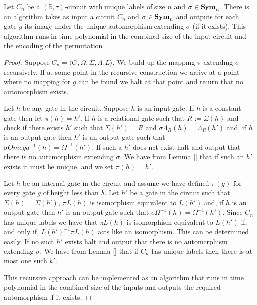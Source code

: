 \documentclass[../paper.tex]{subfiles}
\begin{document}
\begin{lem}
  Let $C_n$ be a $(\mathbb{B}, \tau)$-circuit with unique labels of size $n$ and
  $\sigma \in \text{\textbf{Sym}}_n$. There is an algorithm takes as input a circuit $C_n$ and
  $\sigma \in \text{\textbf{Sym}}_n$ and outputs for each gate $g$ its image under the unique
  automorphism extending $\sigma$ (if it exists). This algorithm runs in time
  polynomial in the combined size of the input circuit and the encoding of the
  permutation.
  \label{lem:compute-automorphisms}
\end{lem}
\begin{proof}
  Suppose $C_n = \langle G, \Omega, \Sigma, \Lambda, L \rangle$. We build up the
  mapping $\pi$ extending $\sigma$ recursively. If at some point in the
  recursive construction we arrive at a point where no mapping for $g$ can be
  found we halt at that point and return that no automorphism exists.

  Let $h$ be any gate in the circuit. Suppose $h$ is an input gate. If $h$ is a
  constant gate then let $\pi (h) = h'$. If $h$ is a relational gate such that
  $R := \Sigma(h)$ and check if there exists $h'$ such that $\Sigma (h') = R$
  and $\sigma \Lambda_R(h) = \Lambda_R(h')$ and, if $h$ is an output gate then
  $h'$ is an output gate such that $\sigma Omega^{-1}(h) = \Omega^{-1}(h')$. If
  such a $h'$ does not exist halt and output that there is no automorphism
  extending $\sigma$. We have from Lemma \ref{} that if such an $h'$ exists it
  must be unique, and we set $\pi(h) = h'$.

  Let $h$ be an internal gate in the circuit and assume we have defined $\pi
  (g)$ for every gate $g$ of height less than $h$. Let $h'$ be a gate in the
  circuit such that $\Sigma(h) = \Sigma (h')$, $\pi L(h)$ is isomorphism
  equivalent to $L(h')$ and, if $h$ is an output gate then $h'$ is an output
  gate such that $\sigma \Omega^{-1}(h) = \Omega^{-1}(h')$. Since $C_n$ has
  unique labels we have that $\pi L(h)$ is isomorphism equivalent to $L(h')$ if,
  and only if, $L(h')^{-1}\pi L(h)$ acts like an isomorphism. This can be
  determined easily. If no such $h'$ exists halt and output that there is no
  automorphism extending $\sigma$. We have from Lemma \ref{} that if $C_n$ has
  unique labels then there is at most one such $h'$.

  This recursive approach can be implemented as an algorithm that runs in time
  polynomial in the combined size of the inputs and outputs the required
  automorphism if it exists.
\end{proof}
\end{document}
